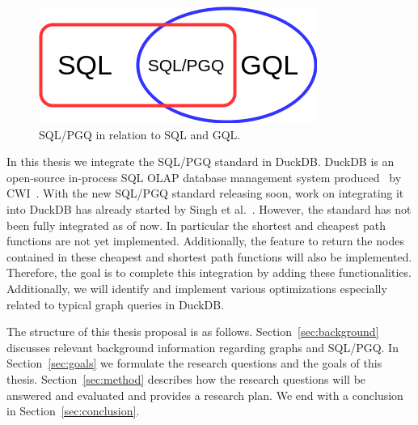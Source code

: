 \begin{figure}
  \includegraphics[width=0.5\linewidth]{figures/SQLPGQ-GQL.png}
  \caption{SQL/PGQ in relation to SQL and GQL.}
  \label{fig:sqlpgqgql}
\end{figure}


In this thesis we integrate the SQL/PGQ standard in DuckDB.
DuckDB is an open-source in-process SQL OLAP database management system produced~\cite{DBLP:conf/sigmod/RaasveldtM19} by CWI~\cite{duckdblabs}. 
With the new SQL/PGQ standard releasing soon, work on integrating it into DuckDB has already started by Singh et al.~\cite{sqlpgq-duckdb}. 
However, the standard has not been fully integrated as of now. In particular the shortest and cheapest path functions are not yet implemented. Additionally, the feature to return the nodes contained in these cheapest and shortest path functions will also be implemented.
Therefore, the goal is to complete this integration by adding these functionalities. Additionally, we will identify and implement various optimizations especially related to typical graph queries in DuckDB.

The structure of this thesis proposal is as follows. Section~\ref{sec:background} discusses relevant background information regarding graphs and SQL/PGQ. In Section~\ref{sec:goals} we formulate the research questions and the goals of this thesis. Section~\ref{sec:method} describes how the research questions will be answered and evaluated and provides a research plan. We end with a conclusion in Section~\ref{sec:conclusion}.  






